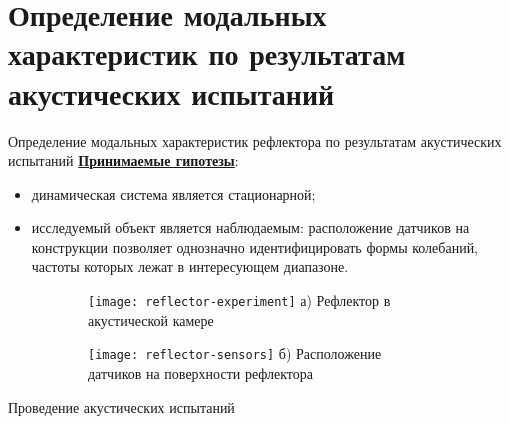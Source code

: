 \section{Определение модальных характеристик по результатам акустических испытаний}

\begin{frame}{Определение модальных характеристик рефлектора по результатам акустических испытаний}
	\textbf{\underline{Принимаемые гипотезы}}:
	\begin{itemize}
		\item динамическая система является стационарной;
		\item исследуемый объект является наблюдаемым: расположение датчиков на конструкции позволяет однозначно идентифицировать формы колебаний, частоты которых лежат в интересующем диапазоне.
	\end{itemize}
	\begin{center}
		\begin{figure}
			\centering
			\small
			\begin{subfigure}[t]{0.49\textwidth}
				\texttt{[image: reflector-experiment]}
				а) Рефлектор в акустической камере
			\end{subfigure}
			\hfill
			\begin{subfigure}[t]{0.49\textwidth}
				\texttt{[image: reflector-sensors]} 
				б) Расположение датчиков на поверхности рефлектора
			\end{subfigure}
		\end{figure}
		\vspace{0.5em}
		Проведение акустических испытаний
	\end{center}
\end{frame}

